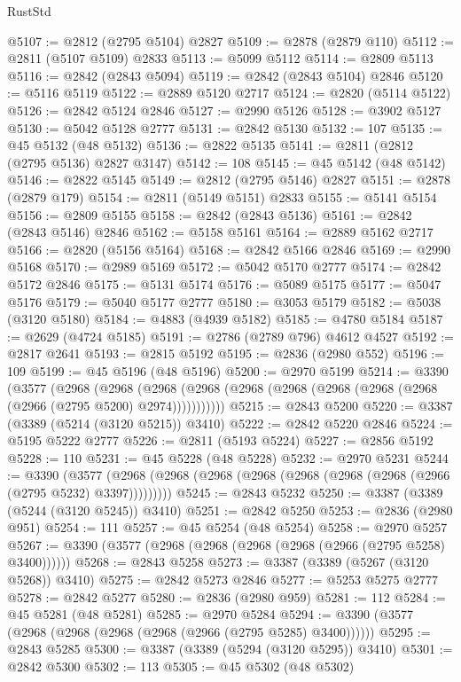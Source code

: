 \begin{lexlean}{RustStd}
\begin{coremodule}
{\begin{coremodule}
{{{{{{{{{{{{{{{{{{{{{{{{{{{{{{{{{@5107 := @2812 (@2795 @5104) @2827
@5109 := @2878 (@2879 @110)
@5112 := @2811 (@5107 @5109) @2833
@5113 := @5099 @5112
@5114 := @2809 @5113
@5116 := @2842 (@2843 @5094)
@5119 := @2842 (@2843 @5104) @2846
@5120 := @5116 @5119
@5122 := @2889 @5120 @2717
@5124 := @2820 (@5114 @5122)
@5126 := @2842 @5124 @2846
@5127 := @2990 @5126
@5128 := @3902 @5127
@5130 := @5042 @5128 @2777
@5131 := @2842 @5130
@5132 := 107
@5135 := @45 @5132 (@48 @5132)
@5136 := @2822 @5135
@5141 := @2811 (@2812 (@2795 @5136) @2827 @3147)
@5142 := 108
@5145 := @45 @5142 (@48 @5142)
@5146 := @2822 @5145
@5149 := @2812 (@2795 @5146) @2827
@5151 := @2878 (@2879 @179)
@5154 := @2811 (@5149 @5151) @2833
@5155 := @5141 @5154
@5156 := @2809 @5155
@5158 := @2842 (@2843 @5136)
@5161 := @2842 (@2843 @5146) @2846
@5162 := @5158 @5161
@5164 := @2889 @5162 @2717
@5166 := @2820 (@5156 @5164)
@5168 := @2842 @5166 @2846
@5169 := @2990 @5168
@5170 := @2989 @5169
@5172 := @5042 @5170 @2777
@5174 := @2842 @5172 @2846
@5175 := @5131 @5174
@5176 := @5089 @5175
@5177 := @5047 @5176
@5179 := @5040 @5177 @2777
@5180 := @3053 @5179
@5182 := @5038 (@3120 @5180)
@5184 := @4883 (@4939 @5182)
@5185 := @4780 @5184
@5187 := @2629 (@4724 @5185)
@5191 := @2786 (@2789 @796) @4612 @4527
@5192 := @2817 @2641
@5193 := @2815 @5192
@5195 := @2836 (@2980 @552)
@5196 := 109
@5199 := @45 @5196 (@48 @5196)
@5200 := @2970 @5199
@5214 := @3390
    (@3577
      (@2968
        (@2968
          (@2968 (@2968 (@2968 (@2968 (@2968 (@2968 (@2968 (@2966 (@2795 @5200) @2974)))))))))))
@5215 := @2843 @5200
@5220 := @3387 (@3389 (@5214 (@3120 @5215)) @3410)
@5222 := @2842 @5220 @2846
@5224 := @5195 @5222 @2777
@5226 := @2811 (@5193 @5224)
@5227 := @2856 @5192
@5228 := 110
@5231 := @45 @5228 (@48 @5228)
@5232 := @2970 @5231
@5244 := @3390
    (@3577 (@2968 (@2968 (@2968 (@2968 (@2968 (@2968 (@2968 (@2966 (@2795 @5232) @3397)))))))))
@5245 := @2843 @5232
@5250 := @3387 (@3389 (@5244 (@3120 @5245)) @3410)
@5251 := @2842 @5250
@5253 := @2836 (@2980 @951)
@5254 := 111
@5257 := @45 @5254 (@48 @5254)
@5258 := @2970 @5257
@5267 := @3390 (@3577 (@2968 (@2968 (@2968 (@2968 (@2966 (@2795 @5258) @3400))))))
@5268 := @2843 @5258
@5273 := @3387 (@3389 (@5267 (@3120 @5268)) @3410)
@5275 := @2842 @5273 @2846
@5277 := @5253 @5275 @2777
@5278 := @2842 @5277
@5280 := @2836 (@2980 @959)
@5281 := 112
@5284 := @45 @5281 (@48 @5281)
@5285 := @2970 @5284
@5294 := @3390 (@3577 (@2968 (@2968 (@2968 (@2968 (@2966 (@2795 @5285) @3400))))))
@5295 := @2843 @5285
@5300 := @3387 (@3389 (@5294 (@3120 @5295)) @3410)
@5301 := @2842 @5300
@5302 := 113
@5305 := @45 @5302 (@48 @5302)
}}}}}}}}}}}}}}}}}}}}}}}}}}}}}}}}}
\end{coremodule}}
\end{coremodule}
\end{lexlean}
